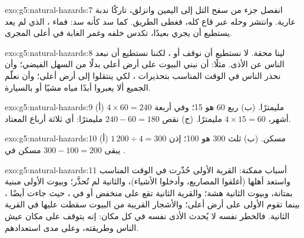 \begin{solution}{exo:g5:natural-hazards:7}
انفصل جزء من سفح التل إلى اليمين وانزلق، تاركًا ندبة
عارية. وانتشر وحله عبر قاع  كله، فغطى الطريق. كما
سد  كأنه سد: فماء ، الذي لم يعد يستطيع أن
يجري بعيدًا، تكدس خلفه وغمر الغابة في أعلى المجرى.
\end{solution}

\begin{solution}{exo:g5:natural-hazards:8}
لينا محقة. لا نستطيع أن نوقف  أو ، لكننا نستطيع أن نبعد الناس
عن الأذى. مثلًا: أن نبني البيوت على أرض أعلى بدلًا من
السهل الفيضي؛ وأن نحذر الناس في الوقت المناسب بتحذيرات ، لكي ينتقلوا
إلى أرض أعلى؛ وأن نعلّم الجميع ألا يعبروا أبدًا مياه  مشيًا أو
بالسيارة.
\end{solution}

\begin{solution}{exo:g5:natural-hazards:9}
(أ) $4 \times 60 = 240$ مليمترًا. (ب) ربع 60 هو 15؛ وفي أربعة
أشهر، $4 \times 15 = 60$ مليمترًا. (ج) نقص $240 - 60 = 180$ مليمترًا:
أي ثلاثة أرباع  المعتاد.
\end{solution}

\begin{solution}{exo:g5:natural-hazards:10}
(أ) $1\,200 \div 4 = 300$ مسكن. (ب) ثلث 300 هو 100؛ إذن يبقى
$300 - 100 = 200$ مسكن في .
\end{solution}

\begin{solution}{exo:g5:natural-hazards:11}
أسباب ممكنة: القرية الأولى حُذّرت في الوقت المناسب واستعد
أهلها (أغلقوا المصاريع، وأدخلوا الأشياء)، والثانية لم تُحذَّر؛ وبيوت
الأولى مبنية بمتانة، وبيوت الثانية هشة؛ والقرية
الثانية تقع على  منخفض أو في ، حيث جاءت  أيضًا
، بينما تقوم الأولى على أرض أعلى؛ والأشجار القريبة من
البيوت سقطت عليها في القرية الثانية. فالخطر نفسه لا يُحدث
الأذى نفسه في كل مكان: إنه يتوقف على مكان عيش الناس وطريقته، وعلى
مدى استعدادهم.
\end{solution}
